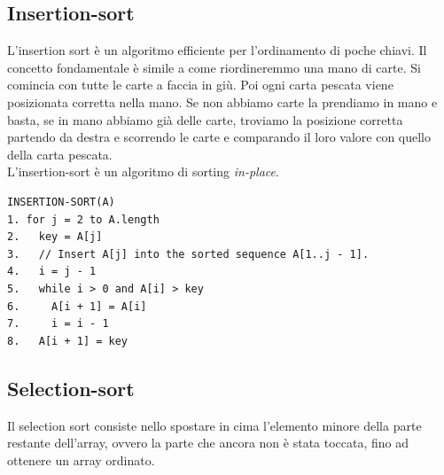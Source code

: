 \documentclass{article}
\begin{document}
\subsection{Insertion-sort}
L'insertion sort è un algoritmo efficiente per l'ordinamento di poche chiavi. Il concetto fondamentale è simile a come riordineremmo una mano di carte. Si comincia con tutte le carte a faccia in giù. Poi ogni carta pescata viene posizionata corretta nella mano. Se non abbiamo carte la prendiamo in mano e basta, se in mano abbiamo già delle carte, troviamo la posizione corretta partendo da destra e scorrendo le carte e comparando il loro valore con quello della carta pescata. \\
L'insertion-sort è un algoritmo di sorting \emph{in-place}.
\begin{lstlisting}
INSERTION-SORT(A)
1. for j = 2 to A.length
2.   key = A[j]
3.   // Insert A[j] into the sorted sequence A[1..j - 1].
4.   i = j - 1
5.   while i > 0 and A[i] > key
6.     A[i + 1] = A[i]
7.     i = i - 1
8.   A[i + 1] = key
\end{lstlisting}
\subsection{Selection-sort}
Il selection sort consiste nello spostare in cima l'elemento minore della parte restante dell'array, ovvero la parte che ancora non è stata toccata, fino ad ottenere un array ordinato.
\end{document}
